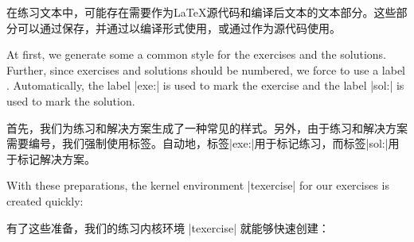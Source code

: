 在练习文本中，可能存在需要作为\LaTeX 源代码和编译后文本的文本部分。这些部分可以通过保存，并通过以编译形式使用，或通过作为源代码使用。

At first, we generate some a common style for the exercises and the
solutions. Further, since exercises and solutions should
be numbered, we force to use a label .
Automatically, the label |exe:| is used to mark the exercise
and the label |sol:| is used to mark the solution.

首先，我们为练习和解决方案生成了一种常见的样式。另外，由于练习和解决方案需要编号，我们强制使用标签。自动地，标签|exe:|用于标记练习，而标签|sol:|用于标记解决方案。

\begin{dispListing}
\end{dispListing}
\tcbusetemp

With these preparations, the kernel environment |texercise| for our
exercises is created quickly:

有了这些准备，我们的练习内核环境 |texercise| 就能够快速创建：




